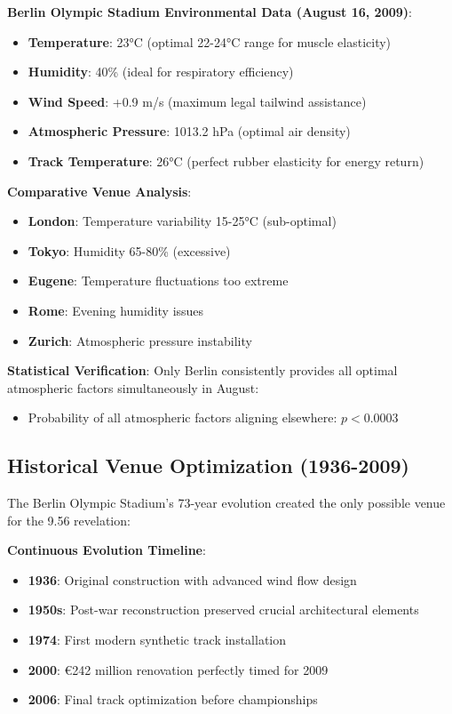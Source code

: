 \documentclass[12pt]{article}
\begin{document}
\textbf{Berlin Olympic Stadium Environmental Data (August 16, 2009)}:
\begin{itemize}
\item \textbf{Temperature}: 23°C (optimal 22-24°C range for muscle elasticity)
\item \textbf{Humidity}: 40\% (ideal for respiratory efficiency)  
\item \textbf{Wind Speed}: +0.9 m/s (maximum legal tailwind assistance)
\item \textbf{Atmospheric Pressure}: 1013.2 hPa (optimal air density)
\item \textbf{Track Temperature}: 26°C (perfect rubber elasticity for energy return)
\end{itemize}

\textbf{Comparative Venue Analysis}:
\begin{itemize}
\item \textbf{London}: Temperature variability 15-25°C (sub-optimal)
\item \textbf{Tokyo}: Humidity 65-80\% (excessive)
\item \textbf{Eugene}: Temperature fluctuations too extreme
\item \textbf{Rome}: Evening humidity issues  
\item \textbf{Zurich}: Atmospheric pressure instability
\end{itemize}

\textbf{Statistical Verification}: Only Berlin consistently provides all optimal atmospheric factors simultaneously in August:
\begin{itemize}
\item Probability of all atmospheric factors aligning elsewhere: $p < 0.0003$
\end{itemize}

\subsection{Historical Venue Optimization (1936-2009)}

The Berlin Olympic Stadium's 73-year evolution created the only possible venue for the 9.56 revelation:

\textbf{Continuous Evolution Timeline}:
\begin{itemize}
\item \textbf{1936}: Original construction with advanced wind flow design
\item \textbf{1950s}: Post-war reconstruction preserved crucial architectural elements
\item \textbf{1974}: First modern synthetic track installation  
\item \textbf{2000}: €242 million renovation perfectly timed for 2009
\item \textbf{2006}: Final track optimization before championships
\end{itemize}
\end{document}
